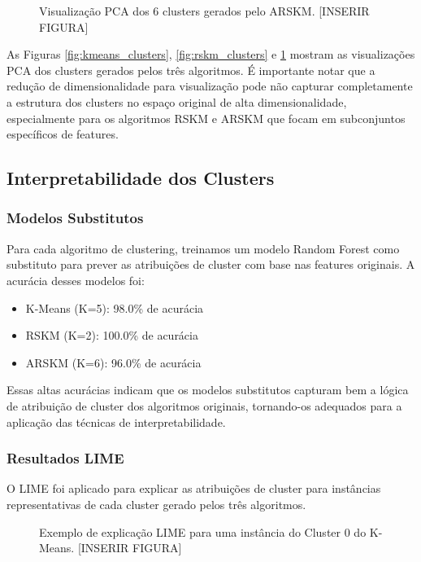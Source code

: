 \documentclass[conference]{IEEEtran}
\begin{document}
\begin{figure}[!t]
\centering
\caption{Visualização PCA dos 6 clusters gerados pelo ARSKM. [INSERIR FIGURA]}
\label{fig:arskm_clusters}
\end{figure}

As Figuras \ref{fig:kmeans_clusters}, \ref{fig:rskm_clusters} e \ref{fig:arskm_clusters} mostram as visualizações PCA dos clusters gerados pelos três algoritmos. É importante notar que a redução de dimensionalidade para visualização pode não capturar completamente a estrutura dos clusters no espaço original de alta dimensionalidade, especialmente para os algoritmos RSKM e ARSKM que focam em subconjuntos específicos de features.

\subsection{Interpretabilidade dos Clusters}
\subsubsection{Modelos Substitutos}
Para cada algoritmo de clustering, treinamos um modelo Random Forest como substituto para prever as atribuições de cluster com base nas features originais. A acurácia desses modelos foi:

\begin{itemize}
    \item K-Means (K=5): 98.0\% de acurácia
    \item RSKM (K=2): 100.0\% de acurácia
    \item ARSKM (K=6): 96.0\% de acurácia
\end{itemize}

Essas altas acurácias indicam que os modelos substitutos capturam bem a lógica de atribuição de cluster dos algoritmos originais, tornando-os adequados para a aplicação das técnicas de interpretabilidade.

\subsubsection{Resultados LIME}
O LIME foi aplicado para explicar as atribuições de cluster para instâncias representativas de cada cluster gerado pelos três algoritmos.

\begin{figure}[!t]
\centering
\caption{Exemplo de explicação LIME para uma instância do Cluster 0 do K-Means. [INSERIR FIGURA]}
\label{fig:kmeans_lime}
\end{figure}
\end{document}
